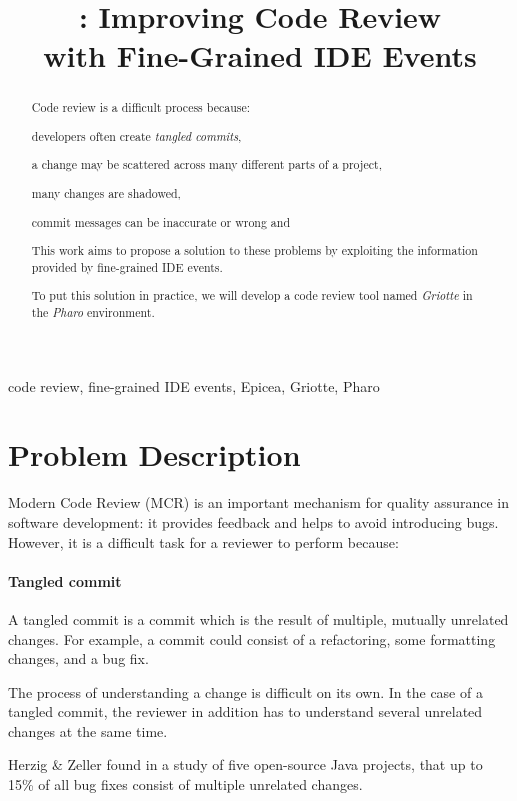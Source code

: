 \documentclass[conference,a4paper]{IEEEtran}
\title{\Gr{}: Improving Code Review\\with Fine-Grained IDE Events}
\author{\IEEEauthorblockN{Skip~Lentz}\IEEEauthorblockA{EEMCS\\Delft
    University of Technology} \and
  \IEEEauthorblockN{Mart\'{i}n~Dias}\IEEEauthorblockA{RMoD\\INRIA
    Lille-Nord Europe}}
\newcommand{\TC}{tangled commit}
\newcommand{\Ep}{Epicea}
\newcommand{\Gr}{Griotte}
\begin{document}
\maketitle{}
\begin{abstract}
  Code review is a difficult process because:
  \begin{enumerate*}[label=(\arabic*)]
  \item developers often create \textit{tangled commits},
  \item a change may be scattered across many different parts of a
    project,
  \item many changes are shadowed,
  \item commit messages can be inaccurate or wrong and
  \end{enumerate*}

  This work aims to propose a solution to these problems by exploiting
  the information provided by fine-grained IDE events.

  To put this solution in practice, we will develop a code review tool
  named \textit{\Gr} in the \textit{Pharo} environment.
\end{abstract}
\begin{IEEEkeywords}
  code review, fine-grained IDE events, \Ep, \Gr, Pharo
\end{IEEEkeywords}

\section{Problem Description}
\label{sec:problem-description}
Modern Code Review (MCR) is an important mechanism for quality
assurance in software development: it provides feedback and helps to
avoid introducing bugs. However, it is a difficult task for a reviewer
to perform because:

\paragraph{Tangled commit}

A \TC{} is a commit which is the result of multiple, mutually
unrelated changes. For example, a commit could consist of a
refactoring, some formatting changes, and a bug fix.

The process of understanding a change is difficult on its own. In the
case of a tangled commit, the reviewer in addition has to understand
several unrelated changes at the same time.

Herzig \& Zeller found in a study of five open-source Java projects,
that up to 15\% of all bug fixes consist of multiple unrelated
changes\cite{Herz11a}.
\end{document}
